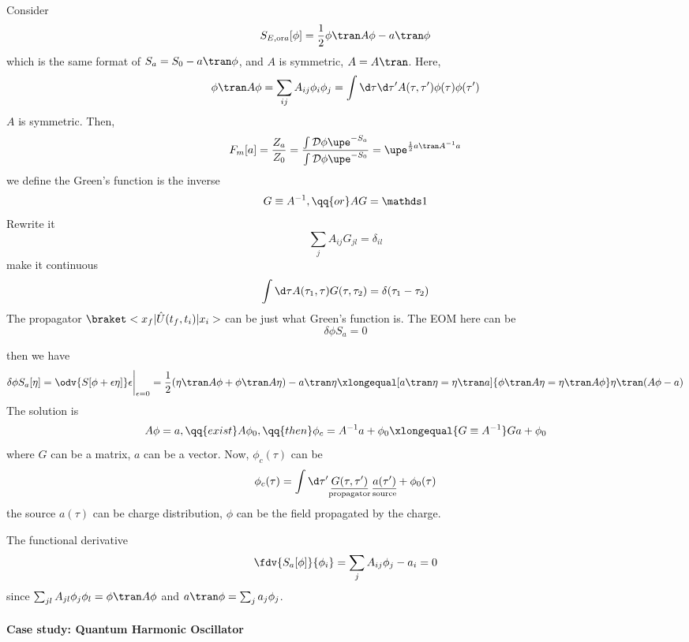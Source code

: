 Consider
\[
  S_{E, \text{or} a}[\phi] = \frac12 \phi\tran A\phi - a\tran\phi
\]
which is the same format of $S_a = S_0 - a\tran\phi$, and $A$ is symmetric,
$A = A\tran$.
Here,
\[
  \phi\tran A\phi = \sum_{ij} A_{ij} \phi_i \phi_j
= \int \d\tau \d\tau' A(\tau, \tau') \phi(\tau) \phi(\tau')
\]
$A$ is symmetric. Then,
\[
  F_m[a] = \frac{Z_a}{Z_0}
= \frac{\int\mathcal D\phi \upe^{-S_a}}{\int \mathcal D\phi \upe^{-S_0}}
= \upe^{\frac12 a\tran A^{-1} a}
\]
we define the Green's function is the inverse
\begin{equation}
  G \equiv A^{-1}, \qq{or} AG = \identity
\end{equation}
Rewrite it
\[
  \sum_j A_{ij} G_{jl} = \delta_{il}
\]
make it continuous
\[
  \int \d\tau A(\tau_1, \tau) G(\tau, \tau_2) = \delta(\tau_1 - \tau_2)
\]
The propagator $\braket<x_f|\hat U(t_f,t_i)|x_i>$ can be just what Green's
function is. The EOM here can be
\[
  \delta\phi S_a = 0
\]
\begin{enumext}
  \item then we have
  \[
    \delta\phi S_a[\eta]
  = \odv{S[\phi + \epsilon\eta]}\epsilon\bigg|_{\epsilon=0}
  = \frac12(\eta\tran A\phi + \phi\tran A\eta) - a\tran\eta
  \xlongequal[a\tran\eta=\eta\tran a]{\phi\tran A\eta = \eta\tran A\phi}
    \eta\tran(A\phi - a)
  \]
  The solution is
  \[
    A\phi = a, \qq{exist} A\phi_0, \qq{then}
    \phi_c = A^{-1}a + \phi_0 \xlongequal{G\equiv A^{-1}} Ga + \phi_0
  \]
  where $G$ can be a matrix, $a$ can be a vector. Now, $\phi_c(\tau)$ can be
  \[
    \phi_c(\tau) = \int \d\tau'
    \underset{\text{propagator}}{\underline{G(\tau, \tau')}} \,
    \underset{\text{source}}{\underline{a(\tau')}} + \phi_0(\tau)
  \]
  the source $a(\tau)$ can be charge distribution,
  $\phi$ can be the field propagated by the charge.
  \item The functional derivative
  \[
    \fdv{S_a[\phi]}{\phi_i} = \sum_j A_{ij} \phi_j - a_i = 0
  \]
  since $\sum_{jl} A_{jl} \phi_j \phi_l = \phi\tran A\phi$ and
  $a\tran\phi = \sum_j a_j\phi_j$.
\end{enumext}

\paragraph{Case study: Quantum Harmonic Oscillator}

